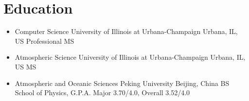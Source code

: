 \documentclass[11pt,a4paper,sans]{moderncv}        %
\begin{document}
\makecvtitle

\vspace{-40pt}
\section{Education}
\vspace{-5pt}
\begin{itemize}
	\item {
	      {Computer Science}
	      {University of Illinois at Urbana-Champaign}
	      {Urbana, IL, US}
	      {Professional MS}
	      {}
	      }
	      
	\item {
	      {Atmospheric Science}
	      {University of Illinois at Urbana-Champaign}
	      {Urbana, IL, US}
	      {MS}
	      {}
	      }
	      
	\item {
	      {Atmospheric and Oceanic Sciences}
	      {Peking University}
	      {Beijing, China}
	      {BS}
	      {School of Physics, G.P.A. Major 3.70/4.0, Overall 3.52/4.0}
	      }
\end{itemize}

\vspace{-5pt}
\end{document}
